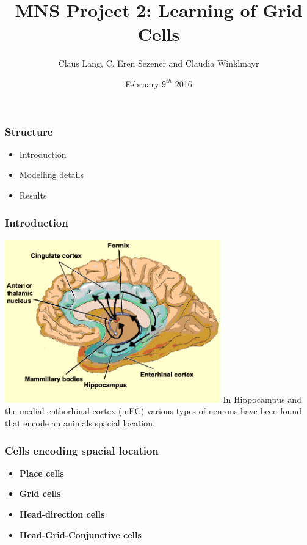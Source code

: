 \documentclass[mathserif]{beamer}
\title[MNS Project 2]{MNS Project 2: Learning of Grid Cells}
\author[C. Lang, C. E. Sezener, C.Winklmayr]{Claus Lang, C. Eren Sezener and Claudia Winklmayr}
\institute{BCCN}
\date[9.2.2016]{February $9^{th}$ 2016}
\begin{document}
\maketitle
%
%
%
\begin{frame}
\frametitle{Structure}
	\begin{itemize}
	\item Introduction\newline
	\item Modelling details\newline
	\item Results
	\end{itemize}
\end{frame}
%
%
%
\begin{frame}
\frametitle{Introduction}
\includegraphics[width=0.7\textwidth]{mEC.jpg}\newline
In Hippocampus and the medial enthorhinal cortex (mEC) various types of neurons have been found that encode an animals spacial location.  
\end{frame}
% 
%
%
\begin{frame}
\frametitle{Cells encoding spacial location}
\begin{itemize}
\item \textbf{Place cells} \newline
\item \textbf{Grid cells} \newline
\item \textbf{Head-direction cells}\newline
\item \textbf{Head-Grid-Conjunctive cells}
\end{itemize}
\end{frame}
\end{document}
